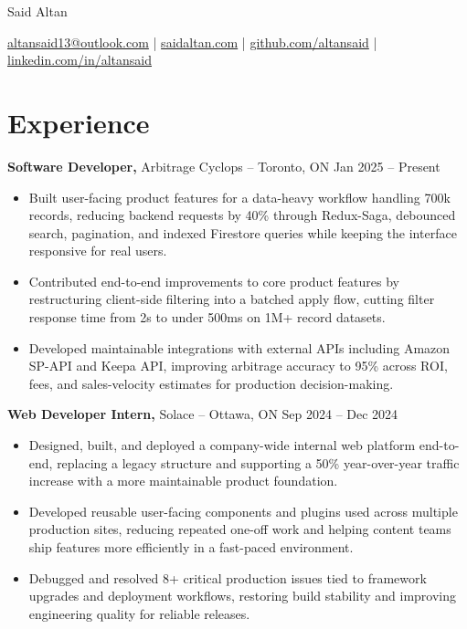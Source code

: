 \documentclass[11pt]{article}       %
\begin{document}
\centerline{\Huge Said Altan}

\vspace{10pt}

\centerline{\href{mailto:altansaid13@outlook.com}{altansaid13@outlook.com} | \href{https://saidaltan.com}{saidaltan.com} | \href{https://github.com/altansaid}{github.com/altansaid} | \href{https://www.linkedin.com/in/altansaid}{linkedin.com/in/altansaid}}


\vspace{5pt}
\section*{Experience}
\textbf{Software Developer,} {Arbitrage Cyclops} -- Toronto, ON \hfill Jan 2025 -- Present \\
\vspace{-9pt}
\begin{itemize}
  \item Built user-facing product features for a data-heavy workflow handling 700k records, reducing backend requests by 40\% through Redux-Saga, debounced search, pagination, and indexed Firestore queries while keeping the interface responsive for real users.
  \item Contributed end-to-end improvements to core product features by restructuring client-side filtering into a batched apply flow, cutting filter response time from 2s to under 500ms on 1M+ record datasets.
  \item Developed maintainable integrations with external APIs including Amazon SP-API and Keepa API, improving arbitrage accuracy to 95\% across ROI, fees, and sales-velocity estimates for production decision-making.
\end{itemize}

\textbf{Web Developer Intern,} {Solace} -- Ottawa, ON \hfill Sep 2024 -- Dec 2024 \\
\vspace{-9pt}
\begin{itemize}
  \item Designed, built, and deployed a company-wide internal web platform end-to-end, replacing a legacy structure and supporting a 50\% year-over-year traffic increase with a more maintainable product foundation.
  \item Developed reusable user-facing components and plugins used across multiple production sites, reducing repeated one-off work and helping content teams ship features more efficiently in a fast-paced environment.
  \item Debugged and resolved 8+ critical production issues tied to framework upgrades and deployment workflows, restoring build stability and improving engineering quality for reliable releases.
\end{itemize}
\end{document}
